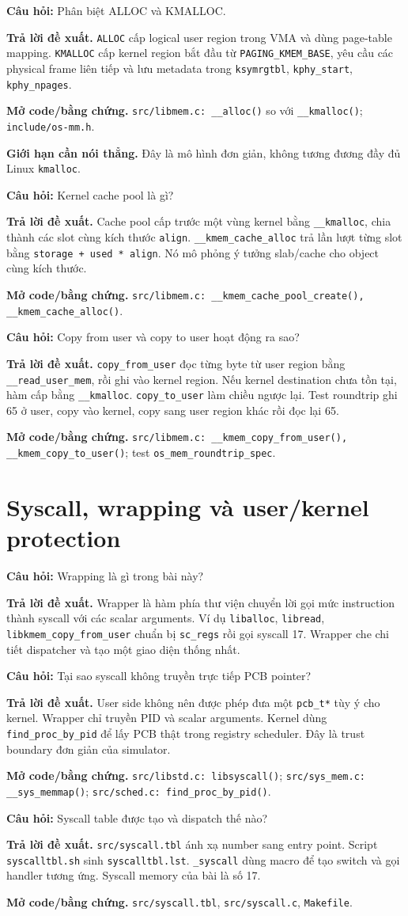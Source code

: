 \documentclass[11pt,a4paper]{article}
\newcommand{\code}[1]{\texttt{\color{navy}#1}}
\newcommand{\q}[1]{%
  \vspace{0.55em}\noindent
  \colorbox{pale}{\parbox{\dimexpr\textwidth-2\fboxsep}{\textbf{\color{navy}Câu hỏi:} #1}}%
  \par\vspace{0.3em}}
\newcommand{\ans}[1]{\textbf{\color{cyan}Trả lời đề xuất.} #1\par}
\newcommand{\proofcode}[1]{\textbf{\color{orange}Mở code/bằng chứng.} #1\par}
\newcommand{\limitanswer}[1]{\textbf{\color{red}Giới hạn cần nói thẳng.} #1\par}
\begin{document}
\q{Phân biệt ALLOC và KMALLOC.}
\ans{\code{ALLOC} cấp logical user region trong VMA và dùng page-table mapping.
\code{KMALLOC} cấp kernel region bắt đầu từ \code{PAGING\_KMEM\_BASE}, yêu cầu
các physical frame liên tiếp và lưu metadata trong \code{ksymrgtbl},
\code{kphy\_start}, \code{kphy\_npages}.}
\proofcode{\code{src/libmem.c: \_\_alloc()} so với \code{\_\_kmalloc()};
\code{include/os-mm.h}.}
\limitanswer{Đây là mô hình đơn giản, không tương đương đầy đủ Linux
\code{kmalloc}.}

\q{Kernel cache pool là gì?}
\ans{Cache pool cấp trước một vùng kernel bằng \code{\_\_kmalloc}, chia thành
các slot cùng kích thước \code{align}. \code{\_\_kmem\_cache\_alloc} trả lần
lượt từng slot bằng \code{storage + used * align}. Nó mô phỏng ý tưởng slab/cache
cho object cùng kích thước.}
\proofcode{\code{src/libmem.c: \_\_kmem\_cache\_pool\_create(),
\_\_kmem\_cache\_alloc()}.}

\q{Copy from user và copy to user hoạt động ra sao?}
\ans{\code{copy\_from\_user} đọc từng byte từ user region bằng
\code{\_\_read\_user\_mem}, rồi ghi vào kernel region. Nếu kernel destination
chưa tồn tại, hàm cấp bằng \code{\_\_kmalloc}. \code{copy\_to\_user} làm chiều
ngược lại. Test roundtrip ghi 65 ở user, copy vào kernel, copy sang user region
khác rồi đọc lại 65.}
\proofcode{\code{src/libmem.c: \_\_kmem\_copy\_from\_user(),
\_\_kmem\_copy\_to\_user()}; test \code{os\_mem\_roundtrip\_spec}.}

\section{Syscall, wrapping và user/kernel protection}

\q{Wrapping là gì trong bài này?}
\ans{Wrapper là hàm phía thư viện chuyển lời gọi mức instruction thành syscall
với các scalar arguments. Ví dụ \code{liballoc}, \code{libread},
\code{libkmem\_copy\_from\_user} chuẩn bị \code{sc\_regs} rồi gọi syscall 17.
Wrapper che chi tiết dispatcher và tạo một giao diện thống nhất.}

\q{Tại sao syscall không truyền trực tiếp PCB pointer?}
\ans{User side không nên được phép đưa một \code{pcb\_t*} tùy ý cho kernel.
Wrapper chỉ truyền PID và scalar arguments. Kernel dùng
\code{find\_proc\_by\_pid} để lấy PCB thật trong registry scheduler. Đây là
trust boundary đơn giản của simulator.}
\proofcode{\code{src/libstd.c: libsyscall()}; \code{src/sys\_mem.c:
\_\_sys\_memmap()}; \code{src/sched.c: find\_proc\_by\_pid()}.}

\q{Syscall table được tạo và dispatch thế nào?}
\ans{\code{src/syscall.tbl} ánh xạ number sang entry point. Script
\code{syscalltbl.sh} sinh \code{syscalltbl.lst}. \code{\_syscall} dùng macro để
tạo switch và gọi handler tương ứng. Syscall memory của bài là số 17.}
\proofcode{\code{src/syscall.tbl}, \code{src/syscall.c}, \code{Makefile}.}
\end{document}
